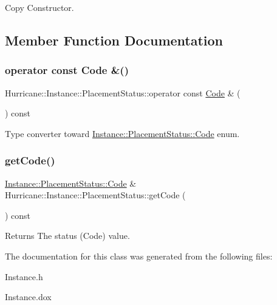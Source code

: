 Copy Constructor. 

\subsection{Member Function Documentation}
\mbox{\label{classHurricane_1_1Instance_1_1PlacementStatus_a375d2547ed3e8a127e34b0ee3ca14ad6}} 
\subsubsection{\texorpdfstring{operator const Code \&()}{operator const Code \&()}}
{\footnotesize\ttfamily Hurricane\+::\+Instance\+::\+Placement\+Status\+::operator const \mbox{\hyperlink{classHurricane_1_1Instance_1_1PlacementStatus_af76cc0838783b3eb3a515eb3c3e0f7bf}{Code}} \& (\begin{DoxyParamCaption}{ }\end{DoxyParamCaption}) const\hspace{0.3cm}{\ttfamily [inline]}}

Type converter toward \mbox{\hyperlink{classHurricane_1_1Instance_1_1PlacementStatus_af76cc0838783b3eb3a515eb3c3e0f7bf}{Instance\+::\+Placement\+Status\+::\+Code}} enum. \mbox{\label{classHurricane_1_1Instance_1_1PlacementStatus_aa907067c594076ed8422bf6c949c8731}} 
\subsubsection{\texorpdfstring{get\+Code()}{getCode()}}
{\footnotesize\ttfamily \mbox{\hyperlink{classHurricane_1_1Instance_1_1PlacementStatus_af76cc0838783b3eb3a515eb3c3e0f7bf}{Instance\+::\+Placement\+Status\+::\+Code}} \& Hurricane\+::\+Instance\+::\+Placement\+Status\+::get\+Code (\begin{DoxyParamCaption}{ }\end{DoxyParamCaption}) const\hspace{0.3cm}{\ttfamily [inline]}}

\begin{DoxyReturn}{Returns}
The status (Code) value. 
\end{DoxyReturn}


The documentation for this class was generated from the following files\+:\begin{DoxyCompactItemize}
\item 
Instance.\+h\item 
Instance.\+dox\end{DoxyCompactItemize}
